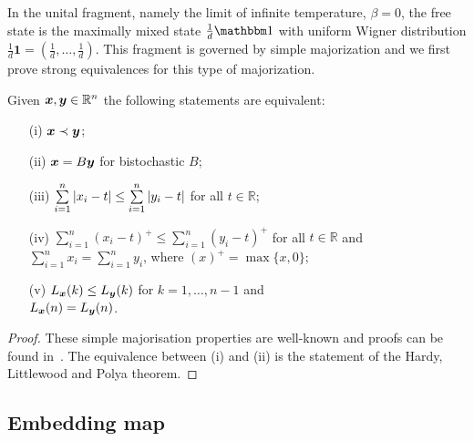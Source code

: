 In the unital fragment, namely the limit of infinite temperature, $\beta = 0$, the free state is the maximally mixed state $\frac{1}{d}\id$ with uniform Wigner distribution $\frac{1}{d}\bm{1}  = (\frac{1}{d},\dots,\frac{1}{d})$.
This fragment is governed by simple majorization and we first prove strong equivalences for this type of majorization.
\begin{proposition}\label{prop:major}
Given $\bm{x}, \bm{y} \in \mathbb{R}^n$ the following statements are equivalent:
 \begin{enumerate}
	\item[(i)]\label{en:m1} $\bm{x} \prec \bm{y}$;
	\item[(ii)]\label{en:m2} $\bm{x} = B \bm{y}$ for bistochastic $B$;
	\item[(iii)]\label{en:m3} $\sum\limits_{i=1}^n \abs{x_i - t} \leq \sum\limits_{i=1}^n \abs{y_i - t}$ for all $t \in \mathbb{R}$;
	\item[(iv)]\label{en:m4} $\sum\limits_{i=1}^n (x_i - t)^+ \leq \sum\limits_{i=1}^n (y_i - t)^+$ for all $t \in \mathbb{R}$ and \vspace{5pt}\\ $\sum\limits_{i=1}^n x_i = \sum\limits_{i=1}^n y_i$, where $(x)^+ = \max{\{x, 0\}}$;
	\item[(v)]\label{en:m5} $L_{\bm{x}}(k) \leq L_{\bm{y}}(k)$ for $k=1,\dots,n-1$	and \vspace{5pt}\\ $L_{\bm{x}}(n) = L_{\bm{y}}(n)$.
 \end{enumerate}
\end{proposition}
\begin{proof}
	These simple majorisation properties are well-known and proofs can be found in~\cite{cit:marshall,cit:bhatia,cit:nielsen,cit:lostaglio}.
	The equivalence between (i) and (ii) is the statement of the Hardy, Littlewood and Polya theorem.
\end{proof}

\subsection{Embedding map}

